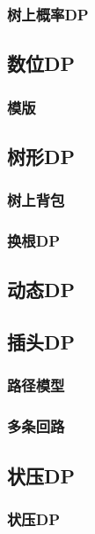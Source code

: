 \documentclass[10pt,a4paper]{article}
\begin{document}
\subsubsection{树上概率DP}

\subsection{数位DP}
\subsubsection{模版}

\subsection{树形DP}
\subsubsection{树上背包}

\subsubsection{换根DP}

\subsection{动态DP}
\begin{spacing}{1.5}

\end{spacing}

\subsection{插头DP}
\subsubsection{路径模型}

\subsubsection{多条回路}

\subsection{状压DP}
\subsubsection{状压DP}
\begin{spacing}{1.5}

\end{spacing}

\end{document}
